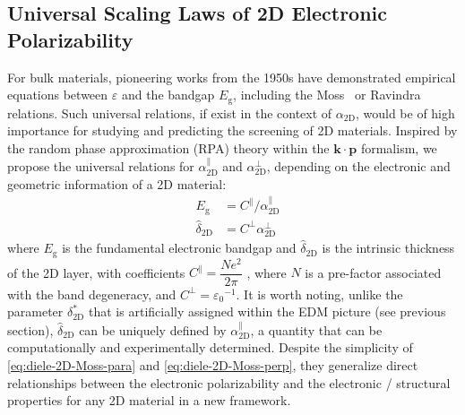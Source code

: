 

\subsection{Universal Scaling Laws of 2D Electronic Polarizability}
\label{sec:diel-univ-scal-laws}

For bulk materials, pioneering works from the 1950s have demonstrated
empirical equations between $\varepsilon$ and the bandgap
$E_{\mathrm{g}}$, including the
Moss~\autocite{Moss_1950_relation,Moss_1985_n_Eg,Finkenrath_1988_moss1} or
Ravindra~\autocite{Ravindra_1980_model,Ravindra_1979_eps_Eg} relations.
Such universal relations, if exist in the context of
$\alpha_{\mathrm{2D}}$, would be of high importance for studying and
predicting the screening of 2D materials.  Inspired by the random
phase approximation (RPA) theory \autocite{Adler_1962_eps} within the
$\mathbf{k} \cdot \mathbf{p}$
formalism\autocite{Kittel_2005_introduction_book,Jiang_2017_Eg_Eb}, we propose
the universal relations for $\alpha_{\mathrm{2D}}^{\parallel}$ and
$\alpha_{\mathrm{2D}}^{\perp}$, depending on the electronic and
geometric information of a 2D material:
\begin{subequations}
\begin{eqnarray}
\label{eq:diele-2D-Moss-para}
  &E_{\mathrm{g}} &= C^{\parallel} / \alpha_{\mathrm{2D}}^{\parallel} \\
  \label{eq:diele-2D-Moss-perp}
  &\hat{\delta}_{\mathrm{2D}} & = C^{\perp} \alpha_{\mathrm{2D}}^{\perp} 
\end{eqnarray}
\end{subequations}
where $E_{\mathrm{g}}$ is the fundamental electronic bandgap and
$\hat{\delta}_{\mathrm{2D}}$ is the intrinsic thickness of the 2D
layer, with coefficients
$C^{\parallel} = \dfrac{Ne^2}{2 \pi}$
\autocite{Jiang_2017_Eg_Eb}, where $N$ is a pre-factor associated with the
band degeneracy, and $C^{\perp} = {\varepsilon_{0}}^{-1}$. It is worth
noting, unlike the parameter $\delta^{*}_{\mathrm{2D}}$ that is
artificially assigned within the EDM picture (see previous section),
$\hat{\delta}_{\mathrm{2D}}$ can be uniquely defined by
$\alpha_{\mathrm{2D}}^{\parallel}$, a quantity that can be
computationally and experimentally determined. Despite the
simplicity of \autoref{eq:diele-2D-Moss-para} and \autoref{eq:diele-2D-Moss-perp},
they generalize direct relationships between the electronic polarizability and
the electronic / structural properties for any 2D material in a new
framework.


